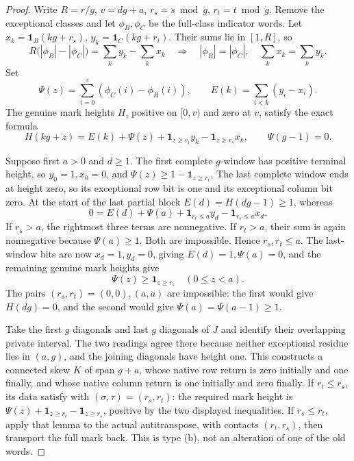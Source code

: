 \documentclass[11pt,a4paper]{amsart}
\numberwithin{equation}{section}
\theoremstyle{plain}
\theoremstyle{definition}
\begin{document}
\begin{proof}
Write \(R=r/g\), \(v=dg+a\),
\(r_s=s\bmod g\), \(r_t=t\bmod g\).  Remove the exceptional
classes and let \(\phi_B,\phi_C\) be the full-class indicator words.
Let \(x_k=\mathbf1_B(kg+r_s)\),
\(y_k=\mathbf1_C(kg+r_t)\).  Their sums lie in \([1,R]\), so
\[
 R\bigl(|\phi_B|-|\phi_C|\bigr)=\sum_k y_k-\sum_k x_k
 \quad\Longrightarrow\quad |\phi_B|=|\phi_C|,
 \quad\sum_kx_k=\sum_ky_k.
\]
Set
\[
 \Psi(z)=\sum_{i=0}^z(\phi_C(i)-\phi_B(i)),\qquad
 E(k)=\sum_{i<k}(y_i-x_i).
\]
The genuine mark heights \(H\), positive on \([0,v)\) and zero
at \(v\), satisfy the exact formula
\begin{equation}\label{ge:eq:ordinary-block}
 H(kg+z)=E(k)+\Psi(z)+\mathbf1_{z\ge r_t}y_k
                         -\mathbf1_{z\ge r_s}x_k,
 \qquad \Psi(g-1)=0.
\end{equation}

Suppose first \(a>0\) and \(d\ge1\).  The first complete
\(g\)-window has positive terminal height, so \(y_0=1,x_0=0\),
and \(\Psi(z)\ge1-\mathbf1_{z\ge r_t}\).  The last complete window
ends at height zero, so its exceptional row bit is one and its exceptional
column bit zero.  At the start of the last partial block
\(E(d)=H(dg-1)\ge1\), whereas
\[
 0=E(d)+\Psi(a)+\mathbf1_{r_t\le a}y_d
                      -\mathbf1_{r_s\le a}x_d.
\]
If \(r_s>a\), the rightmost three terms are nonnegative.  If
\(r_t>a\), their sum is again nonnegative because \(\Psi(a)\ge1\).
Both are impossible.  Hence \(r_s,r_t\le a\).  The last-window
bits are now \(x_d=1,y_d=0\), giving \(E(d)=1,\Psi(a)=0\),
and the remaining genuine mark heights give
\[
 \Psi(z)\ge\mathbf1_{z\ge r_s}\quad(0\le z<a).
\]
The pairs \((r_s,r_t)=(0,0),(a,a)\) are impossible: the first
would give \(H(dg)=0\), and the second would give
\(\Psi(a)=\Psi(a-1)\ge1\).

Take the first \(g\) diagonals and last \(g\) diagonals of \(J\)
and identify their overlapping private interval.  The two readings agree
there because neither exceptional residue lies in \((a,g)\), and the
joining diagonals have height one.  This constructs a connected skew
\(K\) of span \(g+a\), whose native row return is zero initially
and one finally, and whose native column return is one initially and zero
finally.  If \(r_t\le r_s\), its data satisfy
 with \((\sigma,\tau)=(r_s,r_t)\): the
required mark height is
\(\Psi(z)+\mathbf1_{z\ge r_t}-\mathbf1_{z\ge r_s}\), positive by the
two displayed inequalities.  If \(r_s\le r_t\), apply that lemma
to the actual antitranspose, with contacts \((r_t,r_s)\), then
transport the full mark back.  This is type (b), not an alteration of
one of the old words.


\end{proof}
\end{document}

